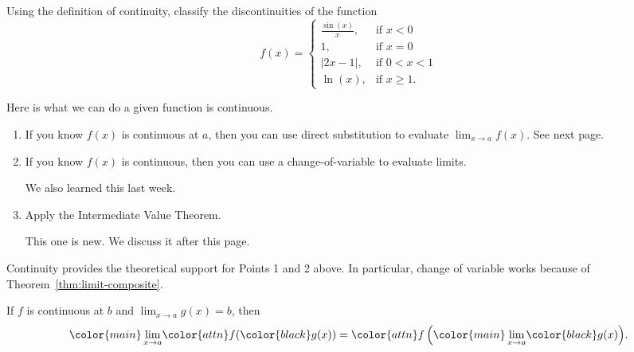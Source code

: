 \documentclass[../main.tex]{subfiles}
\begin{document}
\begin{exercise}
  Using the definition of continuity, classify the discontinuities of the function
  \[
    f(x) =
    \begin{cases}
      \frac{\sin(x)}{x}, & \text{if } x < 0 \\[1ex]
      1,                 & \text{if } x = 0\\[1ex]
      |2x-1|,            & \text{if } 0 < x < 1 \\[1ex]
      \ln(x),            & \text{if } x \ge 1.
    \end{cases}
  \]

  \blanks*
\end{exercise}
\clearpage

Here is what we can do  a given function is continuous.

\begin{sidefigure}{}
  \begin{enumerate}[wide, itemsep={2ex}]
    \item If you know \(f(x)\) is continuous at \(a\), then you can use direct substitution to evaluate \(\lim_{x \to a} f(x)\).  See next page.

    \item If you know \(f(x)\) is continuous, then you can use a change-of-variable to evaluate limits.

      We also learned this last week.

    \item Apply the Intermediate Value Theorem.

      This one is new. We discuss it after this page.
  \end{enumerate}
\end{sidefigure}

\vspace{1in}

Continuity provides the theoretical support for Points 1 and 2 above. In particular, change of variable works because of Theorem~\ref{thm:limit-composite}.

\begin{thm} \label{thm:limit-composite}
  If \(f\) is continuous at \(b\) and \(\lim_{x \to a} g(x) = b\), then
  \[
    {\color{main} \lim_{x \to a}} {\color{attn}f({\color{black}g(x)})} = {\color{attn}f \left( {\color{main} \lim_{x \to a}} {\color{black} g(x) }\right)}.
  \]

\end{thm}
\end{document}
